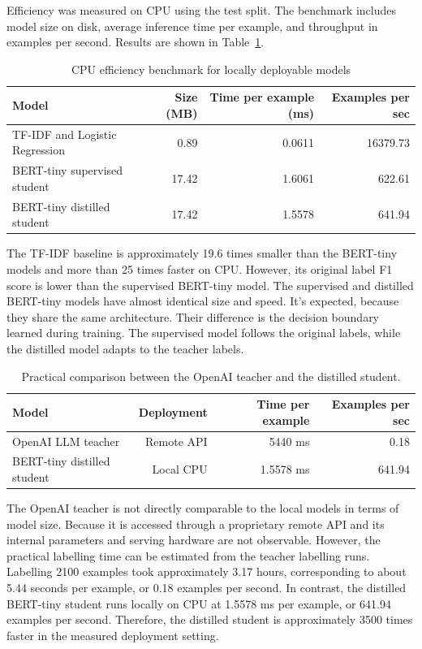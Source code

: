 \documentclass[pdflatex,sn-mathphys-num]{sn-jnl}
\begin{document}
Efficiency was measured on CPU using the test split.
The benchmark includes model size on disk, average inference time per example, and throughput in examples per second.
Results are shown in Table~\ref{tab:benchmark}.

\begin{table}[h]
\caption{CPU efficiency benchmark for locally deployable models}\label{tab:benchmark}
\centering
\begin{tabular}{lrrr}
\toprule
Model & Size (MB) & Time per example (ms) & Examples per sec \\
\midrule
TF-IDF and Logistic Regression & 0.89 & 0.0611 & 16379.73 \\
BERT-tiny supervised student & 17.42 & 1.6061 & 622.61 \\
BERT-tiny distilled student & 17.42 & 1.5578 & 641.94 \\
\bottomrule
\end{tabular}
\end{table}

The TF-IDF baseline is approximately 19.6 times smaller than the BERT-tiny models and more than 25 times faster on CPU.
However, its original label F1 score is lower than the supervised BERT-tiny model.
The supervised and distilled BERT-tiny models have almost identical size and speed.
It's expected, because they share the same architecture.
Their difference is the decision boundary learned during training.
The supervised model follows the original labels, while the distilled model adapts to the teacher labels.

\begin{table}[h]
\caption{Practical comparison between the OpenAI teacher and the distilled student.}
\label{tab:teacher-student-efficiency}
\centering
\begin{tabular}{lrrr}
\toprule
Model & Deployment & Time per example & Examples per sec \\
\midrule
OpenAI LLM teacher & Remote API & 5440 ms & 0.18 \\
BERT-tiny distilled student & Local CPU & 1.5578 ms & 641.94 \\
\bottomrule
\end{tabular}
\end{table}

The OpenAI teacher is not directly comparable to the local models in terms of model size.
Because it is accessed through a proprietary remote API and its internal parameters and serving hardware are not observable.
However, the practical labelling time can be estimated from the teacher labelling runs.
Labelling 2100 examples took approximately 3.17 hours, corresponding to about 5.44 seconds per example, or 0.18 examples per second.
In contrast, the distilled BERT-tiny student runs locally on CPU at 1.5578 ms per example, or 641.94 examples per second.
Therefore, the distilled student is approximately 3500 times faster in the measured deployment setting.
\end{document}
